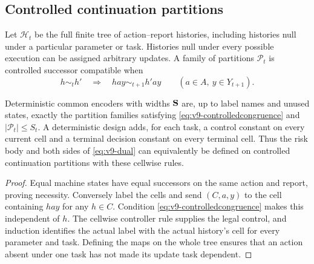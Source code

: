 \subsection{Controlled continuation partitions}
Let $\mathcal H_t$ be the full finite tree of action--report histories,
including histories null under a particular parameter or task. Histories
null under every possible execution can be assigned arbitrary updates.
A family of partitions $\mathcal P_t$ is controlled successor compatible
when
\begin{equation}
 h\sim_t h'\quad\Longrightarrow\quad
             hay\sim_{t+1}h'ay\qquad(a\in A,\ y\in Y_{t+1}).
 \label{eq:v9-controlledcongruence}
\end{equation}
\begin{proposition}\label{prop:v9-partitions}
Deterministic common encoders with widths ${\bf S}$ are, up to label
names and unused states, exactly the partition families satisfying
\eqref{eq:v9-controlledcongruence} and $|\mathcal P_t|\le S_t$.
A deterministic design adds, for each task, a control constant on every
current cell and a terminal decision constant on every terminal cell.
Thus the risk body and both sides of \eqref{eq:v9-dual} can equivalently
be defined on controlled continuation partitions with these cellwise
rules.
\end{proposition}
\begin{proof}
Equal machine states have equal successors on the same action and
report, proving necessity. Conversely label the cells and send $(C,a,y)$
to the cell containing $hay$ for any $h\in C$. Condition
\eqref{eq:v9-controlledcongruence} makes this independent of $h$.
The cellwise controller rule supplies the legal control, and induction
identifies the actual label with the actual history's cell for every
parameter and task. Defining the maps on the whole tree ensures that an
action absent under one task has not made its update task dependent.
\end{proof}

